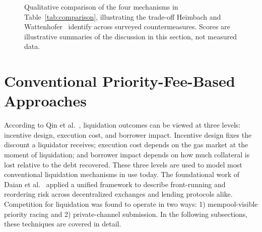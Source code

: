 \documentclass{llncs}
\begin{document}
\begin{figure}[h]
\centering
{}
\caption{Qualitative comparison of the four mechanisms in
Table~\ref{tab:comparison}, illustrating the trade-off Heimbach and
Wattenhofer~\cite{heimbach2022sok} identify across surveyed
countermeasures. Scores are illustrative summaries of the discussion in
this section, not measured data.}
\label{fig:tradeoffs}
\end{figure}

\section{Conventional Priority-Fee-Based Approaches}

According to Qin et al.~\cite{qin2021empirical}, liquidation outcomes can
be viewed at three levels: incentive design, execution cost, and
borrower impact. Incentive design fixes the discount a liquidator
receives; execution cost depends on the gas market at the moment of
liquidation; and borrower impact depends on how much collateral is lost
relative to the debt recovered. These three levels are used to model
most conventional liquidation mechanisms in use today. The foundational
work of Daian et al.~\cite{daian2019flash} applied a unified framework to
describe front-running and reordering risk across decentralized
exchanges and lending protocols alike. Competition for liquidation was
found to operate in two ways: 1) mempool-visible priority racing and 2)
private-channel submission. In the following subsections, these
techniques are covered in detail.
\end{document}
